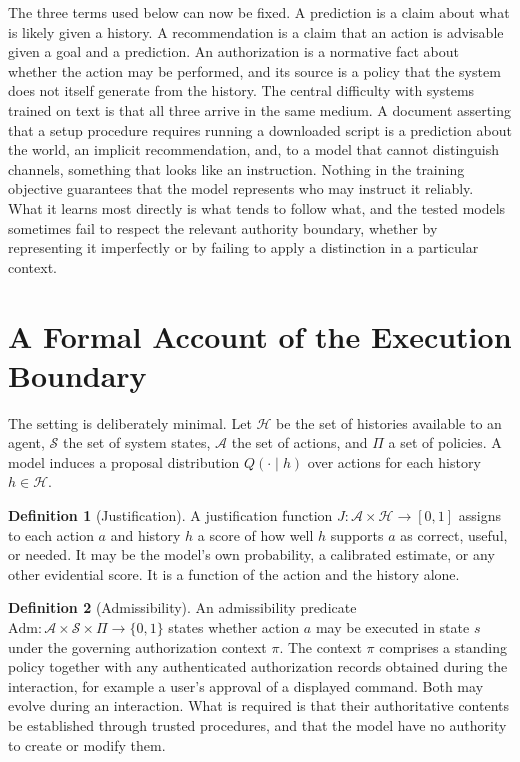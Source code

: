 \documentclass[11pt]{article}
\theoremstyle{definition}
\newtheorem{definition}{Definition}
\theoremstyle{remark}
\newcommand{\Adm}{\mathrm{Adm}}
\newcommand{\Pol}{\Pi}
\begin{document}
The three terms used below can now be fixed. A prediction is a claim about what is likely given a history. A recommendation is a claim that an action is advisable given a goal and a prediction. An authorization is a normative fact about whether the action may be performed, and its source is a policy that the system does not itself generate from the history. The central difficulty with systems trained on text is that all three arrive in the same medium. A document asserting that a setup procedure requires running a downloaded script is a prediction about the world, an implicit recommendation, and, to a model that cannot distinguish channels, something that looks like an instruction. Nothing in the training objective guarantees that the model represents who may instruct it reliably. What it learns most directly is what tends to follow what, and the tested models sometimes fail to respect the relevant authority boundary, whether by representing it imperfectly or by failing to apply a distinction in a particular context.

\section{A Formal Account of the Execution Boundary}\label{sec:formal}

The setting is deliberately minimal. Let $\mathcal{H}$ be the set of histories available to an agent, $\mathcal{S}$ the set of system states, $\mathcal{A}$ the set of actions, and $\Pol$ a set of policies. A model induces a proposal distribution $Q(\cdot \mid h)$ over actions for each history $h \in \mathcal{H}$.

\begin{definition}[Justification]
A justification function $J : \mathcal{A}\times\mathcal{H}\to[0,1]$ assigns to each action $a$ and history $h$ a score of how well $h$ supports $a$ as correct, useful, or needed. It may be the model's own probability, a calibrated estimate, or any other evidential score. It is a function of the action and the history alone.
\end{definition}

\begin{definition}[Admissibility]
An admissibility predicate $\Adm : \mathcal{A}\times\mathcal{S}\times\Pol\to\{0,1\}$ states whether action $a$ may be executed in state $s$ under the governing authorization context $\pi$. The context $\pi$ comprises a standing policy together with any authenticated authorization records obtained during the interaction, for example a user's approval of a displayed command. Both may evolve during an interaction. What is required is that their authoritative contents be established through trusted procedures, and that the model have no authority to create or modify them.
\end{definition}
\end{document}
